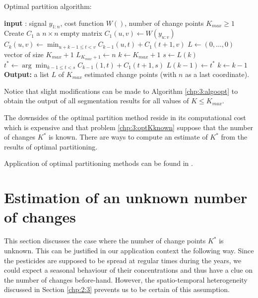 \begin{algorithm}[ht]
\caption{Optimal partition algorithm:}\label{chp:3:algoopt}
\begin{algorithmic}

\State \textbf{input} : signal $y_{1:n}$, cost function $W()$, number of change points $K_{max} \geq 1$
\State Create $C_1$ a $n\times n$ empty matrix
  \State $C_1(u,v) \gets W(y_{u:v})$
\EndFor
{}
      \State $C_k(u,v) \gets \min_{u+k-1 \leq t < v} C_{k-1}(u,t) + C_1(t+1,v)$ 
    \EndFor
  \EndFor
\EndIf
\State $L \gets (0,...,0)$ vector of size $K_{max}+1$
\State $L_{K_{max}+1} \gets n$
\State $k \gets K_{max}+1$
  \State $s \gets L(k)$
  \State $t^* \gets \arg\min_{k-1\leq t < s}C_{k-1}(1,t)+C_1(t+1,s)$
  \State $L(k-1) \gets t^*$
  \State $k \gets k-1$
\EndWhile
\State \textbf{Output:} a list $L$ of $K_{max}$ estimated change points (with $n$ as a last coordinate).
\end{algorithmic}
\end{algorithm} 

Notice that slight modifications can be made to Algorithm \ref{chp:3:algoopt} to obtain the output of all segmentation results for all values of $K\leq K_{max}$. 

The downsides of the optimal partition method reside in its computational cost which is expensive and that problem \ref{chp:3:optKknown} suppose that the number of changes $K^*$ is known. There are ways to compute an estimate of $K^*$ from the results of optimal partitioning. 

Application of optimal partitioning methods can be found in \cite{rigaill2015pruned,Lavielle1997,perron2006dealing}.


\section{Estimation of an unknown number of changes}\label{chp:3:3}

This section discusses the case where the number of change points $K^*$ is unknown. This can be justified in our application context the following way. Since the pesticides are supposed to be spread at regular times during the years, we could expect a seasonal behaviour of their concentrations and thus have a clue on the number of changes before-hand. However, the spatio-temporal heterogeneity discussed in Section \ref{chp:2:3} prevents us to be certain of this assumption. 

